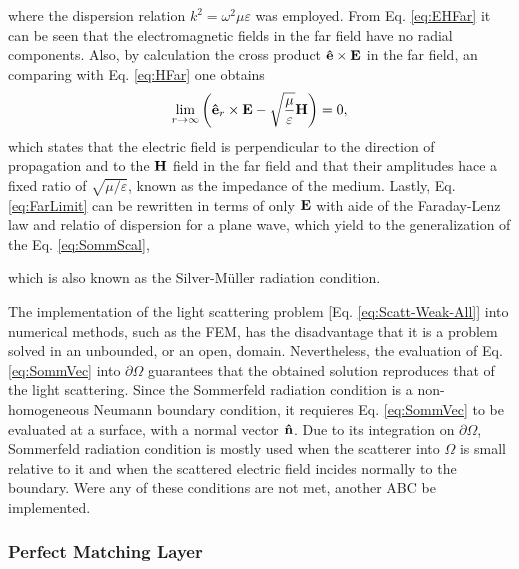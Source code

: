 where the dispersion relation $k^2 = \omega^2\mu\varepsilon$ was employed. From Eq. \eqref{eq:EHFar} it can be seen that the electromagnetic fields in the far field have no radial components. Also, by calculation the cross product $\vu{e}\times\vb{E}$ in the far field, an comparing with Eq. \eqref{eq:HFar} one obtains
%
\begin{align}
    \lim_{r\to\infty} \qty(\vu{e}_r\times\vb{E} - \sqrt{\frac{\mu}{\varepsilon}} \vb{H}) = 0,
    \label{eq:FarLimit}
\end{align}
%
which states that the electric field is perpendicular to the direction of propagation and to the $\vb{H}$ field in the far field and that their amplitudes hace a fixed ratio of $\sqrt{{\mu}/{\varepsilon}}$, known as the impedance of the medium. Lastly, Eq. \eqref{eq:FarLimit} can be rewritten in terms of only $\vb{E}$ with aide of the Faraday-Lenz law and relatio of dispersion for a plane wave, which yield to the generalization of the Eq. \eqref{eq:SommScal},
%
%
 \noindent%
which is also known as the Silver-Müller radiation condition.

The implementation of the light scattering problem [Eq. \eqref{eq:Scatt-Weak-All}] into numerical methods, such as the FEM, has the disadvantage that it is a problem solved in an unbounded, or an open, domain. Nevertheless, the evaluation of Eq. \eqref{eq:SommVec} into $\partial\Omega$ guarantees that the obtained solution reproduces that of the light scattering. Since the Sommerfeld radiation  condition is a non-homogeneous Neumann boundary condition, it  requieres Eq. \eqref{eq:SommVec} to be evaluated at a surface, with a normal vector $\vu{n}$. Due to its integration on $\partial\Omega$, Sommerfeld radiation condition is mostly used when the scatterer into $\Omega$ is small relative to it and when the scattered electric field incides normally to the boundary.  Were any of these conditions are not met, another ABC be implemented.

    \subsubsection{Perfect Matching Layer}

